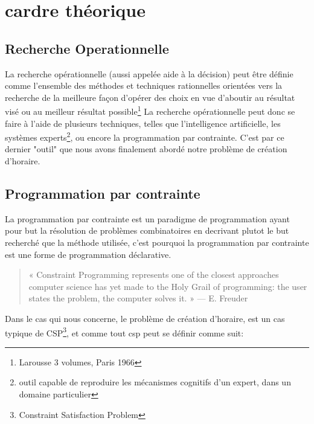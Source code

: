 \section{cardre théorique}
\subsection{Recherche Operationnelle}
La recherche opérationnelle (aussi appelée aide à la décision) peut être définie comme l'ensemble des méthodes et techniques rationnelles orientées vers la recherche de la meilleure façon d'opérer des choix en vue d'aboutir au résultat visé ou au meilleur résultat possible\footnote{Larousse 3 volumes, Paris 1966}
La recherche opérationnelle peut donc se faire à l'aide de plusieurs techniques, telles que l'intelligence artificielle, les systèmes experts\footnote{outil capable de reproduire les mécanismes cognitifs d'un expert, dans un domaine particulier}, ou encore la programmation par contrainte.  C'est par ce dernier "outil" que nous avons finalement abordé notre problème de création d'horaire.
\subsection{Programmation par contrainte}

La programmation par contrainte est un paradigme de programmation ayant pour but la résolution de problèmes combinatoires en
 decrivant plutot le but recherché que la méthode utilisée, c'est pourquoi la programmation par contrainte est une forme de programmation déclarative.
\begin{quote}
« Constraint Programming represents one of the closest approaches computer science has yet made to the Holy Grail of programming: the user states the problem, the computer solves it. »
— E. Freuder
\end{quote}

Dans le cas qui nous concerne, le problème de création d'horaire, est un cas typique de CSP\footnote{Constraint Satisfaction Problem}, et comme tout csp peut se définir comme suit:
   
